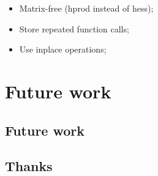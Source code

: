 \begin{frame}[fragile]
  \begin{itemize}
    \item Matrix-free (hprod instead of hess);
    \item Store repeated function calls;
    \item Use inplace operations;
  \end{itemize}
\end{frame}

\section{Future work}

\subsection{Future work}


\subsection{Thanks}
